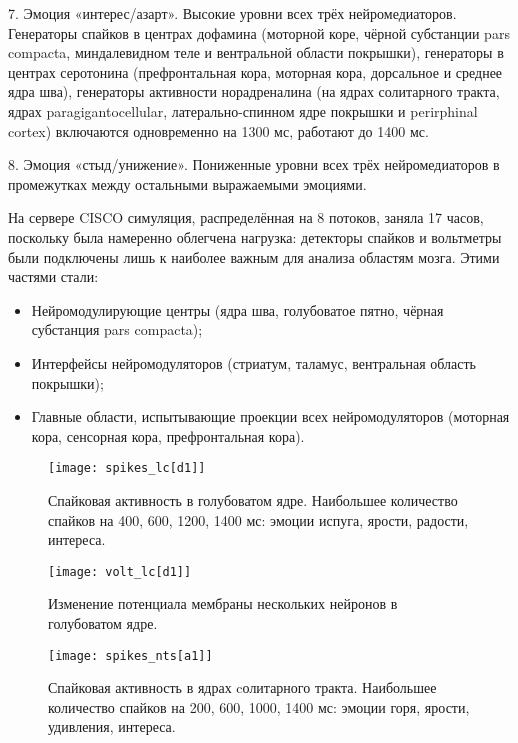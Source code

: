 7. Эмоция «интерес/азарт». Высокие уровни всех трёх нейромедиаторов. Генераторы спайков в центрах дофамина (моторной коре, чёрной субстанции pars compacta, миндалевидном теле и вентральной области покрышки), генераторы в центрах серотонина (префронтальная кора, моторная кора, дорсальное и среднее ядра шва), генераторы активности норадреналина (на ядрах солитарного тракта, ядрах paragigantocellular, латерально-спинном ядре покрышки и perirphinal cortex) включаются одновременно на 1300 мс, работают до 1400 мс.


8. Эмоция «стыд/унижение». Пониженные уровни всех трёх нейромедиаторов в промежутках между остальными выражаемыми эмоциями.


На сервере CISCO симуляция, распределённая на 8 потоков, заняла 17 часов, поскольку была намеренно облегчена нагрузка: детекторы спайков и вольтметры были подключены лишь к наиболее важным для анализа областям мозга. Этими частями стали: \begin{itemize}
\item Нейромодулирующие центры (ядра шва, голубоватое пятно, чёрная субстанция pars compacta);
\item Интерфейсы нейромодуляторов (стриатум, таламус, вентральная область покрышки);
\item Главные области, испытывающие проекции всех нейромодуляторов (моторная кора, сенсорная кора, префронтальная кора).
\end{itemize}



\begin{figure}
	\centering
	\texttt{[image: spikes\_lc[d1]]}
	\caption{Спайковая активность в голубоватом ядре. Наибольшее количество спайков на 400, 600, 1200, 1400 мс: эмоции испуга, ярости, радости, интереса.}
	\label{fig:spikes_lc}
\end{figure}

\begin{figure}
	\centering
	\texttt{[image: volt\_lc[d1]]}
	\caption{Изменение потенциала мембраны нескольких нейронов в голубоватом ядре.}
	\label{fig:volt_lc}
\end{figure}

\begin{figure}
	\centering
	\texttt{[image: spikes\_nts[a1]]}
	\caption{Спайковая активность в ядрах cолитарного тракта. Наибольшее количество спайков на 200, 600, 1000, 1400 мс: эмоции горя, ярости, удивления, интереса.}
	\label{fig:spikes_nts}
\end{figure}

